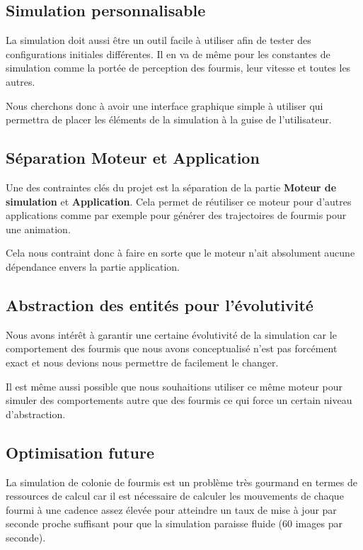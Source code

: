 \documentclass{EPUProjetDi}
\begin{document}
\subsection*{Simulation personnalisable}

La simulation doit aussi être un outil facile à utiliser afin de tester des configurations initiales différentes.
Il en va de même pour les constantes de simulation comme la portée de perception des fourmis, leur vitesse et toutes les autres.

Nous cherchons donc à avoir une interface graphique simple à utiliser qui permettra de placer les éléments de la simulation à la guise
de l'utilisateur.

\subsection*{Séparation Moteur et Application}

Une des contraintes clés du projet est la séparation de la partie \textbf{Moteur de simulation} et \textbf{Application}.
Cela permet de réutiliser ce moteur pour d'autres applications comme par exemple pour générer des trajectoires de fourmis 
pour une animation.

Cela nous contraint donc à faire en sorte que le moteur n'ait absolument aucune dépendance envers la partie application.

\subsection*{Abstraction des entités pour l'évolutivité}

Nous avons intérêt à garantir une certaine évolutivité de la simulation car le comportement des fourmis que nous avons conceptualisé
n'est pas forcément exact et nous devions nous permettre de facilement le changer.

Il est même aussi possible que nous souhaitions utiliser ce même moteur pour simuler des comportements autre que
des fourmis ce qui force un certain niveau d'abstraction.

\subsection*{Optimisation future}

La simulation de colonie de fourmis est un problème très gourmand en termes de ressources de calcul car il est nécessaire de calculer les mouvements
de chaque fourmi à une cadence assez élevée pour atteindre un taux de mise à jour par seconde proche suffisant pour que la simulation paraisse fluide 
(60 images par seconde).
\end{document}

